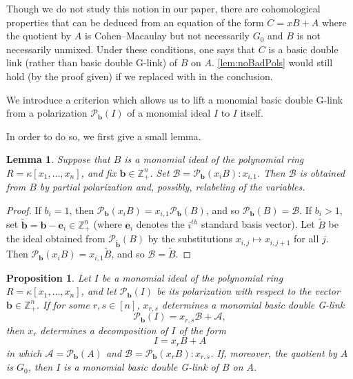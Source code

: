 \documentclass[12pt, reqno]{amsart}
\numberwithin{equation}{section}
\newtheorem{proposition}[theorem]{Proposition}
\newtheorem{lemma}[theorem]{Lemma}
\newtheorem{Main Conjecture}[theorem]{Main Conjecture}
\theoremstyle{definition}
\theoremstyle{plain}
\newcommand{\ZZ}{\mathbb{Z}}
\newcommand{\A}{\mathcal{A}}
\newcommand{\B}{\mathcal{B}}
\renewcommand{\P}{\mathcal{P}}
\newcommand{\bb}{\mathbf{b}}
\newcommand{\be}{\mathbf{e}}
\begin{document}
 Though we do not study this notion in our paper, there are cohomological properties that can be deduced from an equation of the form $C = xB+A$ where the quotient by $A$ is Cohen--Macaulay but not necessarily $G_0$ and $B$ is not necessarily unmixed.  Under these conditions, one says that $C$ is a basic double link (rather than basic double G-link) of $B$ on $A$.  \cref{lem:noBadPols} would still hold (by the proof given) if we replaced  with  in the conclusion.



We introduce a criterion which allows us to lift a monomial basic double G-link from a polarization $\P_{\bb}(I)$ of a monomial ideal $I$ to $I$ itself.

In order to do so, we first give a small lemma.

\begin{lemma}\label{lem:polarization-in-disguise}
Suppose that $B$ is a monomial ideal of the polynomial ring $R = \kappa[x_1, \ldots, x_n]$, and fix $\bb \in \ZZ_+^n$. Set $\B = \P_{\bb}(x_iB):x_{i,1}$.  Then $\B$ is obtained from $B$ by partial polarization and, possibly, relabeling of the variables.
\end{lemma}
\begin{proof}
If $b_i = 1$, then $\P_{\bb}(x_iB) = x_{i,1}\P_{\bb}(B)$, and so $\P_{\bb}(B) = \B$.  If $b_i>1$, set $\tilde{\bb} = \bb-\be_i \in \ZZ_+^n$ (where $\be_i$ denotes the $i^{th}$ standard basis vector).  Let $\tilde{B}$ be the ideal obtained from $\P_{\tilde{\bb}}(B)$ by the substitutions $x_{i,j} \mapsto x_{i,j+1}$ for all $j$.  Then $\P_{\bb}(x_iB) = x_{i,1}\tilde{B}$, and so $\B = \tilde{B}$.
\end{proof}


 \begin{proposition}\label{prop:liftPol}
 Let $I$ be a monomial ideal of the polynomial ring $R = \kappa[x_1, \ldots, x_n]$, and let $\P_{\bb}(I)$ be its polarization with respect to the vector $\bb \in \ZZ_+^n$.  
 If for some $r,s \in [n]$,  $x_{r,s}$ determines a monomial basic double G-link 
 \[
 \P_{\bb}(I) = x_{r,s}\B + \A,
 \]
 then $x_r$ determines a decomposition of $I$ of the form
 $$ I = x_rB+A$$
 in which $\A=\P_{\bb}(A)$ and $\B = \P_{\bb}(x_rB):x_{r,s}$. If, moreover, the quotient by $A$ is $G_0$, then $I$ is a monomial basic double G-link of $B$ on $A$.
\end{proposition}
 
\end{document}
